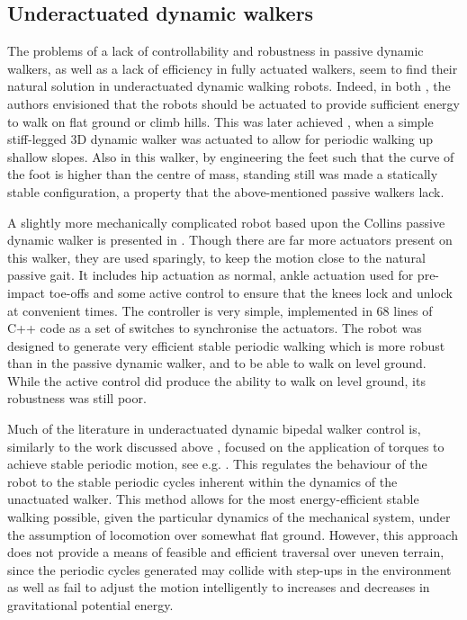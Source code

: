 \subsection{Underactuated dynamic walkers}
The problems of a lack of controllability and robustness in passive dynamic walkers, as well as a lack of efficiency in fully actuated walkers, seem to find their natural solution in underactuated dynamic walking robots. Indeed, in both \cite{mcgeer1990passive, collins2001three}, the authors envisioned that the robots should be actuated to provide sufficient energy to walk on flat ground or climb hills. This was later  achieved \cite{tedrake2004actuating}, when a simple stiff-legged 3D dynamic walker was actuated to allow for periodic walking up shallow slopes. Also in this walker, by engineering the feet such that the curve of the foot is higher than the centre of mass, standing still was made a statically stable configuration, a property that the above-mentioned passive walkers lack.

A slightly more mechanically complicated robot based upon the Collins passive dynamic walker is presented in \cite{collins2005bipedal}. Though there are far more actuators present on this walker, they are used sparingly, to keep the motion close to the natural passive gait. It includes hip actuation as normal, ankle actuation used for pre-impact toe-offs and some active control to ensure that the knees lock and unlock at convenient times. The controller is very simple, implemented in 68 lines of C++ code as a set of switches to synchronise the actuators. The robot was designed to generate very efficient stable periodic walking which is more robust than in the passive dynamic walker, and to be able to walk on level ground. While the active control did produce the ability to walk on level ground, its robustness was still poor.

Much of the literature in underactuated dynamic bipedal walker control is, similarly to the work discussed above \cite{tedrake2004actuating, collins2005bipedal}, focused on the application of torques to achieve stable periodic motion, see e.g. \cite{grizzle2001asymptotically, shiriaev2005constructive, sreenath2011compliant}. This regulates the behaviour of the robot to the stable periodic cycles inherent within the dynamics of the unactuated walker. This method allows for the most energy-efficient stable walking possible, given the particular dynamics of the mechanical system, under the assumption of locomotion over somewhat flat ground. However, this approach does not provide a means of feasible and efficient traversal over uneven terrain, since the periodic cycles generated may collide with step-ups in the environment as well as fail to adjust the motion intelligently to increases and decreases in gravitational potential energy.

